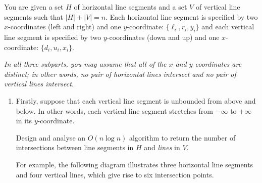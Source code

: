 \documentclass[12pt]{article}
\begin{document}

\begin{question}
You are given a set $H$ of horizontal line segments and a set $V$ of vertical line segments such that $\lvert H \rvert + \lvert V \rvert = n$. Each horizontal line segment is specified by two $x$-coordinates (left and right) and one $y$-coordinate: $\{\ell_i, r_i, y_i\}$ and each vertical line segment is specified by two $y$-coordinates (down and up) and one $x$-coordinate: $\{d_i, u_i, x_i\}$.

{\em In all three subparts, you may assume that all of the $x$ and $y$ coordinates are distinct; in other words, no pair of horizontal lines intersect and no pair of vertical lines intersect.}

\begin{enumerate}[label = (\alph*)]
    \item Firstly, suppose that each vertical line segment is unbounded from above and below. In other words, each vertical line segment stretches from $-\infty$ to $+\infty$ in its $y$-coordinate.

    Design and analyse an $O(n \log n)$ algorithm to return the number of intersections between line segments in $H$ and {\em lines} in $V$.

    For example, the following diagram illustrates three horizontal line segments and four vertical lines, which give rise to six intersection points.
    \begin{center}
    \end{center}


\end{enumerate}
\end{question}
\end{document}
